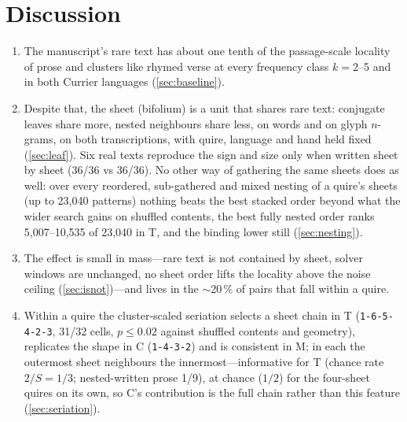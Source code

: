 \documentclass[11pt,a4paper]{article}
\newcommand{\order}[1]{\texttt{#1}}
\begin{document}
\section{Discussion}
\label{sec:discussion}

\begin{establishes}
\begin{enumerate}
\item The manuscript's rare text has about one tenth of the passage-scale locality of prose and clusters like rhymed verse at every frequency class $k=2$--5 and in both Currier languages (\cref{sec:baseline}).
\item Despite that, the sheet (bifolium) is a unit that shares rare text: conjugate leaves share more, nested neighbours share less, on words and on glyph $n$-grams, on both transcriptions, with quire, language and hand held fixed (\cref{sec:leaf}). Six real texts reproduce the sign and size only when written sheet by sheet (36/36 vs 36/36). No other way of gathering the same sheets does as well: over every reordered, sub-gathered and mixed nesting of a quire's sheets (up to 23,040 patterns) nothing beats the best stacked order beyond what the wider search gains on shuffled contents, the best fully nested order ranks 5,007--10,535 of 23,040 in T, and the binding lower still (\cref{sec:nesting}).
\item The effect is small in mass---rare text is not contained by sheet, solver windows are unchanged, no sheet order lifts the locality above the noise ceiling (\cref{sec:isnot})---and lives in the $\sim$20\,\% of pairs that fall within a quire.
\item Within a quire the cluster-scaled seriation selects a sheet chain in T (\order{1-6-5-4-2-3}, 31/32 cells, $p\le0.02$ against shuffled contents and geometry), replicates the shape in C (\order{1-4-3-2}) and is consistent in M; in each the outermost sheet neighbours the innermost---informative for T (chance rate $2/S=1/3$; nested-written prose 1/9), at chance ($1/2$) for the four-sheet quires on its own, so C's contribution is the full chain rather than this feature (\cref{sec:seriation}).
\end{enumerate}
\end{establishes}
\end{document}
